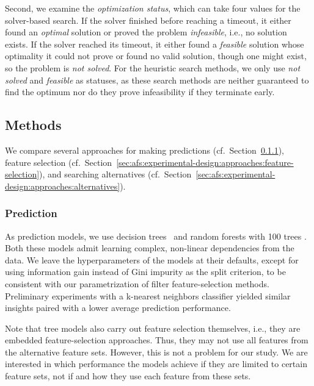 \documentclass{article}
\theoremstyle{definition}
\begin{document}
Second, we examine the \emph{optimization status}, which can take four values for the solver-based search.
If the solver finished before reaching a timeout, it either found an \emph{optimal} solution or proved the problem \emph{infeasible}, i.e., no solution exists.
If the solver reached its timeout, it either found a \emph{feasible} solution whose optimality it could not prove or found no valid solution, though one might exist, so the problem is \emph{not solved}.
For the heuristic search methods, we only use \emph{not solved} and \emph{feasible} as statuses, as these search methods are neither guaranteed to find the optimum nor do they prove infeasibility if they terminate early.

\subsection{Methods}
\label{sec:afs:experimental-design:approaches}

We compare several approaches for making predictions (cf.~Section~\ref{sec:afs:experimental-design:approaches:prediction}), feature selection (cf.~Section~\ref{sec:afs:experimental-design:approaches:feature-selection}), and searching alternatives (cf.~Section~\ref{sec:afs:experimental-design:approaches:alternatives}).

\subsubsection{Prediction}
\label{sec:afs:experimental-design:approaches:prediction}

As prediction models, we use decision trees~\cite{breiman1984classification} and random forests with 100 trees \cite{breiman2001random}.
Both these models admit learning complex, non-linear dependencies from the data.
We leave the hyperparameters of the models at their defaults, except for using information gain instead of Gini impurity as the split criterion, to be consistent with our parametrization of filter feature-selection methods.
Preliminary experiments with a k-nearest neighbors classifier yielded similar insights paired with a lower average prediction performance.

Note that tree models also carry out feature selection themselves, i.e., they are embedded feature-selection approaches.
Thus, they may not use all features from the alternative feature sets.
However, this is not a problem for our study.
We are interested in which performance the models achieve if they are limited to certain feature sets, not if and how they use each feature from these sets.
\end{document}

